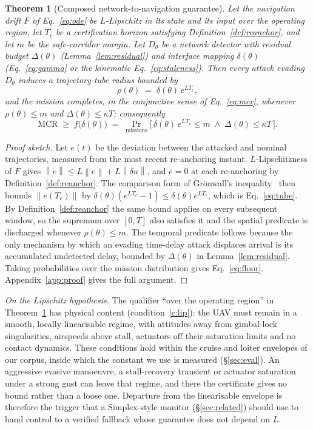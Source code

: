 \documentclass[conference,letterpaper,10pt]{IEEEtran}   %
\newcommand{\Norm}[1]{\left\lVert #1\right\rVert}
\newcommand{\MCR}{\mathrm{MCR}}
\newtheorem{theorem}{Theorem}
\begin{document}
\begin{theorem}[Composed network-to-navigation guarantee]
\label{thm:main}
Let the navigation drift $F$ of Eq.~\eqref{eq:ode} be $L$-Lipschitz in its state
and its input over the operating region, let $T_c$ be a certification horizon satisfying
Definition~\ref{def:reanchor}, and let $m$ be the safe-corridor margin. Let
$D_\theta$ be a network detector with residual budget $\Delta(\theta)$
(Lemma~\ref{lem:residual}) and interface mapping $\delta(\theta)$
(Eq.~\eqref{eq:gamma} or the kinematic Eq.~\eqref{eq:staleness}). Then every attack
evading $D_\theta$ induces a trajectory-tube radius bounded by
\begin{equation}
\label{eq:tube}
\rho(\theta) \;=\; \delta(\theta)\,e^{L T_c},
\end{equation}
and the mission completes, in the conjunctive sense of Eq.~\eqref{eq:mcr},
whenever $\rho(\theta)\le m$ and $\Delta(\theta)\le\kappa T$; consequently
\begin{equation}
\label{eq:floor}
\MCR \;\ge\; f\big(\delta(\theta)\big) \;=\;
\Pr_{\text{missions}}\!\big[\,\delta(\theta)\,e^{LT_c}\le m
\;\wedge\; \Delta(\theta)\le\kappa T\,\big].
\end{equation}
\end{theorem}
\begin{proof}[Proof sketch]
Let $e(t)$ be the deviation between the attacked and nominal trajectories,
measured from the most recent re-anchoring instant. $L$-Lipschitzness of $F$
gives $\Norm{\dot e}\le L\Norm{e}+L\Norm{\delta u}$, and $e=0$ at each
re-anchoring by Definition~\ref{def:reanchor}. The comparison form of
Gr\"onwall's inequality~\cite{gronwall1919} then bounds $\Norm{e(T_c)}$ by
$\delta(\theta)(e^{LT_c}-1)\le\delta(\theta)e^{LT_c}$, which is
Eq.~\eqref{eq:tube}. By
Definition~\ref{def:reanchor} the same bound applies on every subsequent window,
so the supremum over $[0,T]$ also satisfies it and the spatial
predicate is discharged whenever $\rho(\theta)\le m$. The temporal predicate follows because
the only mechanism by which an evading time-delay attack displaces arrival is
its accumulated undetected delay, bounded by $\Delta(\theta)$ in
Lemma~\ref{lem:residual}. Taking probabilities over the mission distribution
gives Eq.~\eqref{eq:floor}. Appendix~\ref{app:proof} gives the full argument.
\end{proof}

\emph{On the Lipschitz hypothesis.} The qualifier ``over the operating region''
in Theorem~\ref{thm:main} has physical content (condition~\ref{c:lip}): the
UAV must remain in a smooth, locally linearisable regime, with attitudes
away from gimbal-lock singularities, airspeeds above stall, actuators off their
saturation limits and no contact dynamics. These conditions hold within the
cruise and loiter envelopes of our corpus, inside which the constant we use is
measured (\S\ref{sec:eval}). An aggressive evasive manoeuvre, a stall-recovery
transient or actuator saturation under a strong gust can leave that regime, and
there the certificate gives no bound rather than a loose one. Departure from the
linearisable envelope is therefore the trigger that a Simplex-style monitor
(\S\ref{sec:related}) should use to hand control to a verified fallback whose
guarantee does not depend on $L$.
\end{document}

